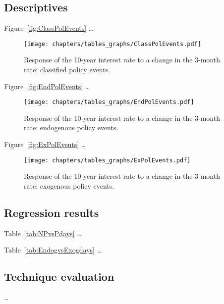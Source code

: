 
\subsection{Descriptives}

Figure~\vref{fig:ClassPolEvents} \dots
\begin{figure}[htbp]
	\centering
		\texttt{[image: chapters/tables\_graphs/ClassPolEvents.pdf]} 
	\caption{Response of the 10-year interest rate to a change in the 3-month rate: classified policy events.}
\label{fig:ClassPolEvents}
\end{figure}
%

Figure~\vref{fig:EndPolEvents} \dots
\begin{figure}[htbp]
	\centering
	\texttt{[image: chapters/tables\_graphs/EndPolEvents.pdf]} 
	\caption{Response of the 10-year interest rate to a change in the 3-month rate: endogenous policy events.}
	\label{fig:EndPolEvents}
\end{figure}
%

Figure~\vref{fig:ExPolEvents} \dots
\begin{figure}[htbp]
	\centering
	\texttt{[image: chapters/tables\_graphs/ExPolEvents.pdf]} 
	\caption{Response of the 10-year interest rate to a change in the 3-month rate: exogenous policy events.}
	\label{fig:ExPolEvents}
\end{figure}
%

\subsection{Regression results}

Table~\vref{tab:NPvsPdays} \dots 

%

Table~\vref{tab:EndogvsExogdays} \dots 

%

%
%
%

\subsection{Technique evaluation}

\dots %